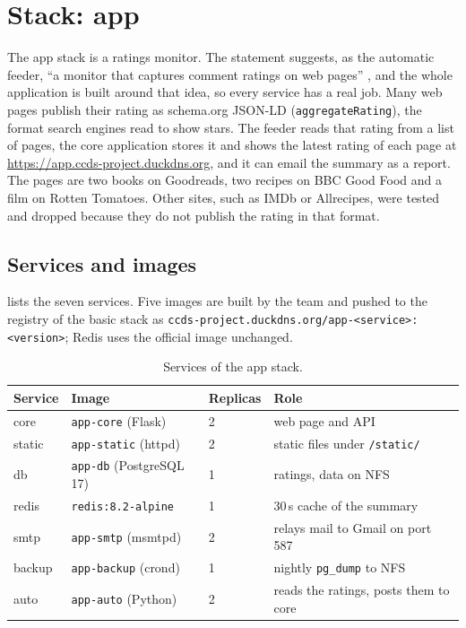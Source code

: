 \section{Stack: app}
\label{sec:stack-app}

The app stack is a ratings monitor. The statement suggests, as the
automatic feeder, ``a monitor that captures comment ratings on web
pages'' \parencite{llusa2026project}, and the whole application is
built around that idea, so every service has a real job. Many web pages
publish their rating as schema.org JSON-LD (\texttt{aggregateRating}),
the format search engines read to show stars. The feeder reads that
rating from a list of pages, the core application stores it and shows
the latest rating of each page at
\url{https://app.ccds-project.duckdns.org}, and it can email the
summary as a report. The pages are two books on Goodreads, two recipes
on BBC Good Food and a film on Rotten Tomatoes. Other sites, such as
IMDb or Allrecipes, were tested and dropped because they do not publish
the rating in that format.

\subsection{Services and images}

 lists the seven services. Five images are built
by the team and pushed to the registry of the basic stack as
\texttt{ccds-project.duckdns.org/app-<service>:<version>}; Redis uses the
official image unchanged.

\begin{table}[htbp]
  \centering
  \caption{Services of the app stack.}
  \label{tab:app-services}
  \small
  \begin{tabular}{llll}
    \toprule
    Service & Image                         & Replicas & Role \\
    \midrule
    core    & \texttt{app-core} (Flask)     & 2 & web page and API \\
    static  & \texttt{app-static} (httpd)   & 2 & static files under \texttt{/static/} \\
    db      & \texttt{app-db} (PostgreSQL 17) & 1 & ratings, data on NFS \\
    redis   & \texttt{redis:8.2-alpine}     & 1 & 30\,s cache of the summary \\
    smtp    & \texttt{app-smtp} (msmtpd)    & 2 & relays mail to Gmail on port 587 \\
    backup  & \texttt{app-backup} (crond)   & 1 & nightly \texttt{pg\_dump} to NFS \\
    auto    & \texttt{app-auto} (Python)    & 2 & reads the ratings, posts them to core \\
    \bottomrule
  \end{tabular}
\end{table}

